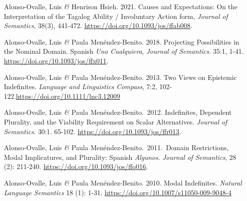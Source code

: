 \documentclass[11pt]{article}
\begin{document}

Alonso-Ovalle, Luis \textit{\&} Henrison Hsieh. 2021. Causes and Expectations: On the Interpretation of the Tagalog Ability / Involuntary Action form, \textit{Journal of Semantics}, 38(3), 441-472. \href{https://doi.org/10.1093/jos/ffab008}{https://doi.org/10.1093/jos/ffab008}.

Alonso-Ovalle, Luis \textit{\&} Paula Men\'endez-Benito. 2018. Projecting Possibilities in the Nominal Domain. Spanish \textit{Uno Cualquiera}, \textit{Journal of Semantics}. 35:1, 1-41. \\ \hspace*{\fill}\href{https://doi.org/10.1093/jos/ffx011}{https://doi.org/10.1093/jos/ffx011}.




Alonso-Ovalle, Luis \textit{\&} Paula
    Men\'endez-Benito. 2013. Two Views on Epistemic
    Indefinites. \textit{Language and Linguistics Compass}, 7:2, 102-122.\href{https://doi.org/10.1111/lnc3.12009}{https://doi.org/10.1111/lnc3.12009}

Alonso-Ovalle, Luis \textit{\&} Paula
    Men\'endez-Benito.\ 2012. Indefinites, Dependent Plurality, and
    the Viability Requirement on Scalar Alternatives. \textit{Journal
      of Semantics}. 30:1. 65-102. \href{https://doi.org/10.1093/jos/ffr013}{https://doi.org/10.1093/jos/ffr013}. 


Alonso-Ovalle, Luis \textit{\&} Paula
    Men\'endez-Benito.\ 2011.\ Domain Restrictions, Modal
    Implicatures, and Plurality: Spanish \textit{Algunos.}
    \textit{Journal of Semantics}, 28 (2): 211-240. \href{https://doi.org/10.1093/jos/ffq016}{https://doi.org/10.1093/jos/ffq016}. 

Alonso-Ovalle, Luis \textit{\&} Paula
    Men\'endez-Benito. 2010. Modal Indefinites. \textit{Natural
      Language Semantics} 18 (1): 1-31. \href{https://doi.org/10.1007/s11050-009-9048-4}{https://doi.org/10.1007/s11050-009-9048-4} 

\end{document}

